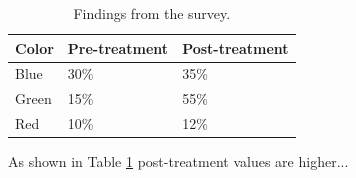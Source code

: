 \documentclass{article}
\begin{document}
\begin{table}[ht]
    \centering
    \begin{tabular}{lll}
        \toprule
        Color & Pre-treatment & Post-treatment \\
        \midrule
        Blue  & 30\% & 35\% \\
        Green & 15\% & 55\% \\
        Red   & 10\% & 12\% \\
        \bottomrule
    \end{tabular}
    \caption{Findings from the survey.}
    \label{tab:findings}
\end{table}

As shown in Table \ref{tab:findings} post-treatment values are higher...
\end{document}

